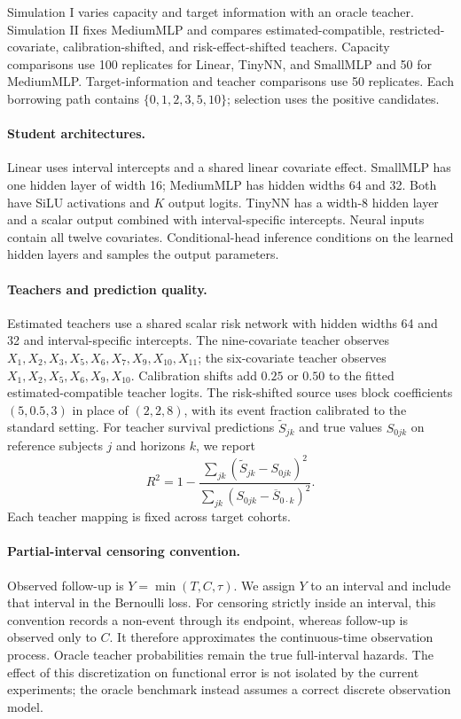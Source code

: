 \documentclass{article} %
\begin{document}
Simulation I varies capacity and target information with an oracle teacher. Simulation II fixes MediumMLP and compares estimated-compatible, restricted-covariate, calibration-shifted, and risk-effect-shifted teachers. Capacity comparisons use 100 replicates for Linear, TinyNN, and SmallMLP and 50 for MediumMLP. Target-information and teacher comparisons use 50 replicates. Each borrowing path contains $\{0,1,2,3,5,10\}$; selection uses the positive candidates.

\paragraph{Student architectures.}
Linear uses interval intercepts and a shared linear covariate effect. SmallMLP has one hidden layer of width 16; MediumMLP has hidden widths 64 and 32. Both have SiLU activations and $K$ output logits. TinyNN has a width-8 hidden layer and a scalar output combined with interval-specific intercepts. Neural inputs contain all twelve covariates. Conditional-head inference conditions on the learned hidden layers and samples the output parameters.

\paragraph{Teachers and prediction quality.}
Estimated teachers use a shared scalar risk network with hidden widths 64 and 32 and interval-specific intercepts. The nine-covariate teacher observes $X_1,X_2,X_3,X_5,X_6,X_7,X_9,X_{10},X_{11}$; the six-covariate teacher observes $X_1,X_2,X_5,X_6,X_9,X_{10}$. Calibration shifts add $0.25$ or $0.50$ to the fitted estimated-compatible teacher logits. The risk-shifted source uses block coefficients $(5,0.5,3)$ in place of $(2,2,8)$, with its event fraction calibrated to the standard setting. For teacher survival predictions $\widetilde S_{jk}$ and true values $S_{0jk}$ on reference subjects $j$ and horizons $k$, we report
\[
R^2=1-\frac{\sum_{jk}(\widetilde S_{jk}-S_{0jk})^2}
{\sum_{jk}(S_{0jk}-\overline S_{0\cdot k})^2}.
\]
Each teacher mapping is fixed across target cohorts.

\paragraph{Partial-interval censoring convention.}
Observed follow-up is $Y=\min(T,C,\tau)$. We assign $Y$ to an interval and include that interval in the Bernoulli loss. For censoring strictly inside an interval, this convention records a non-event through its endpoint, whereas follow-up is observed only to $C$. It therefore approximates the continuous-time observation process. Oracle teacher probabilities remain the true full-interval hazards. The effect of this discretization on functional error is not isolated by the current experiments; the oracle benchmark instead assumes a correct discrete observation model.
\end{document}
